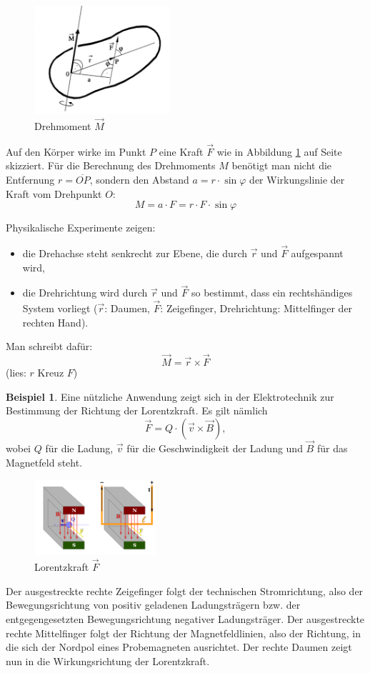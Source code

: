 \documentclass[%
11pt,%
twoside,%
titlepage,%
german,%
headsepline%
]{scrartcl}
\theoremstyle{definition}
\newtheorem{bsp}{Beispiel}[subsection] %
\theoremstyle{plain}
\begin{document}
\begin{figure}[ht]
\begin{center}
\includegraphics[width=5cm]{pictures/vprodukt}
\end{center}
\caption{Drehmoment $\vec{M}$}\label{abb:vektorprod}
\end{figure}

Auf den Körper wirke im Punkt $P$ eine Kraft $\vec{F}$ wie in Abbildung \ref{abb:vektorprod} auf Seite \pageref{abb:vektorprod} skizziert. Für die Berechnung des Drehmoments $M$ benötigt man nicht die Entfernung $r =\overline{OP}$, sondern den Abstand $a =r\cdot\sin\varphi$ der Wirkungslinie der Kraft vom Drehpunkt $O$:
$$M =a\cdot F =r\cdot F\cdot \sin\varphi$$

Physikalische Experimente zeigen:
\begin{itemize}
\item die Drehachse steht senkrecht zur Ebene, die durch
$\vec{r}$ und $\vec{F}$ aufgespannt wird,
\item die Drehrichtung wird durch $\vec{r}$ und $\vec{F}$ so bestimmt,
dass ein rechtshändiges System vorliegt ($\vec{r}$: Daumen,
$\vec{F}$: Zeigefinger, Drehrichtung: Mittelfinger der rechten Hand).
\end{itemize}
Man schreibt dafür:
$$\vec{M}=\vec{r}\times\vec{F}$$
(lies: \glqq $r$ Kreuz $F$\grqq)

\begin{bsp}
Eine nützliche Anwendung zeigt sich in der Elektrotechnik zur Bestimmung der Richtung der Lorentzkraft. Es gilt nämlich
$$\vec{F}=Q\cdot(\vec{v}\times\vec{B}),$$
wobei $Q$ für die Ladung, $\vec{v}$ für die Geschwindigkeit der Ladung und $\vec{B}$ für das Magnetfeld steht.
\begin{figure}
\begin{center}
\includegraphics[width=0.4\textwidth]{pictures/lorentz.png}
\caption{Lorentzkraft $\vec{F}$}
\end{center}
\end{figure}
Der ausgestreckte rechte Zeigefinger folgt der technischen Stromrichtung, also der Bewegungsrichtung von positiv geladenen Ladungsträgern bzw. der entgegengesetzten Bewegungsrichtung negativer Ladungsträger.
Der ausgestreckte rechte Mittelfinger folgt der Richtung der Magnetfeldlinien, also der Richtung, in die sich der Nordpol eines Probemagneten ausrichtet.
Der rechte Daumen zeigt nun in die Wirkungsrichtung der Lorentzkraft.
\end{bsp}

\cleardoublepage

\listoffigures
\end{document}
